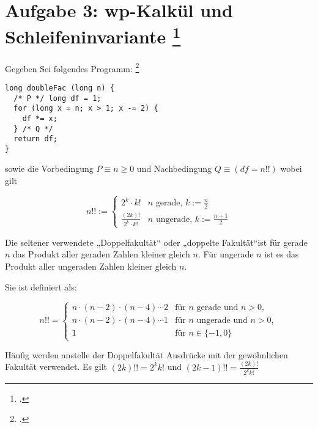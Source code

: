 \documentclass{lehramt-informatik-aufgabe}
\begin{document}

%

\section{Aufgabe 3: wp-Kalkül und Schleifeninvariante
\footcite{sosy:ab:8}
}

Gegeben Sei folgendes Programm:
\footcite[Thema 2 Teilaufgabe 2 Aufgabe 3]{66116:2015:09}

\begin{verbatim}
long doubleFac (long n) {
  /* P */ long df = 1;
  for (long x = n; x > 1; x -= 2) {
    df *= x;
  } /* Q */
  return df;
}
\end{verbatim}

\noindent
sowie die Vorbedingung $P \equiv n \geq 0$ und Nachbedingung $Q \equiv
(df = n!!)$ wobei gilt

\begin{equation*}
n!! :=
\begin{cases}
2^k \cdot k! & n\text{ gerade, }k := \frac{n}{2} \\
\frac{(2k)!}{2^k \cdot k!}& n\text{ ungerade, }k := \frac{n+1}{2}
\end{cases}
\end{equation*}

\begin{exkurs}[Doppelfakultät]
Die seltener verwendete „Doppelfakultät“ oder „doppelte Fakultät“ist für
gerade $n$ das Produkt aller geraden Zahlen kleiner gleich $n$. Für
ungerade $n$ ist es das Produkt aller ungeraden Zahlen kleiner gleich
$n$.

Sie ist definiert als:

\begin{equation*}
n!! = \begin{cases}
n \cdot (n-2) \cdot (n-4) \dotsm 2 & \text{für } n \text{ gerade und } n > 0, \\
n \cdot (n-2) \cdot (n-4) \dotsm 1 & \text{für } n \text{ ungerade und } n > 0, \\
1 & \text{für } n \in \{ -1, 0\}
\end{cases}
\end{equation*}

\noindent
Häufig werden anstelle der Doppelfakultät Ausdrücke mit der gewöhnlichen
Fakultät verwendet. Es gilt $(2k)!! = 2^k k!$  und $(2k-1)!! =
\frac{(2k)!}{2^k k!}$
\end{exkurs}
\end{document}
